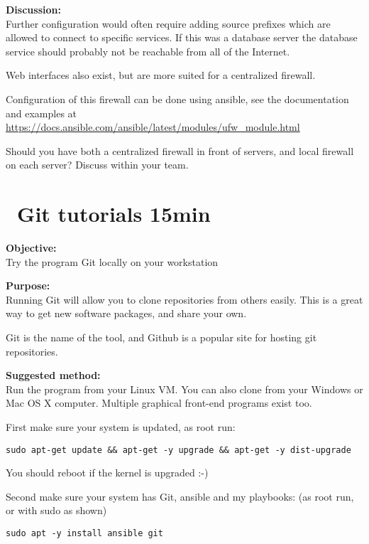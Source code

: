 \documentclass[a4paper,11pt,notitlepage]{report}
\begin{document}
{\bf Discussion:}\\
Further configuration would often require adding source prefixes which are allowed to connect to specific services. If this was a database server the database service should probably not be reachable from all of the Internet.

Web interfaces also exist, but are more suited for a centralized firewall.

Configuration of this firewall can be done using ansible, see the documentation and examples at \url{https://docs.ansible.com/ansible/latest/modules/ufw_module.html}

Should you have both a centralized firewall in front of servers, and local firewall on each server? Discuss within your team.


\chapter{\faExclamationTriangle\ Git tutorials 15min}
\label{ex:git-tutorial}



{\bf Objective:}\\
Try the program Git locally on your workstation

{\bf Purpose:}\\
Running Git will allow you to clone repositories from others easily. This is a great way to get new software packages, and share your own.

Git is the name of the tool, and Github is a popular site for hosting git repositories.

{\bf Suggested method:}\\
Run the program from your Linux VM. You can also clone from your Windows or Mac OS X computer. Multiple graphical front-end programs exist too.


First make sure your system is updated, as root run:

\begin{verbatim}
sudo apt-get update && apt-get -y upgrade && apt-get -y dist-upgrade
\end{verbatim}
You should reboot if the kernel is upgraded :-)

Second make sure your system has Git, ansible and my playbooks: (as root run, or with sudo as shown)
\begin{verbatim}
sudo apt -y install ansible git
\end{verbatim}
\end{document}
